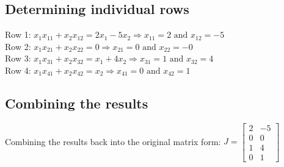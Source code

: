 \documentclass{article}
\begin{document}
\subsection{Determining individual rows}
Row 1: $x_1x_{11}+x_2x_{12}=2x_1-5x_2 \Rightarrow x_{11}=2\text{ and }x_{12}=-5$
\\[0.05in]Row 2: $x_1x_{21}+x_2x_{22}=0 \Rightarrow x_{21}=0\text{ and }x_{22}=-0$
\\[0.05in]Row 3: $x_1x_{31}+x_2x_{32}=x_1+4x_2 \Rightarrow x_{31}=1\text{ and }x_{32}=4$
\\[0.05in]Row 4: $x_1x_{41}+x_2x_{42}=x_2 \Rightarrow x_{41}=0\text{ and }x_{42}=1$
\subsection{Combining the results}
Combining the results back into the original matrix form:
$J=\begin{bmatrix}2&-5\\0&0\\1&4\\0&1\end{bmatrix}$
\end{document}
